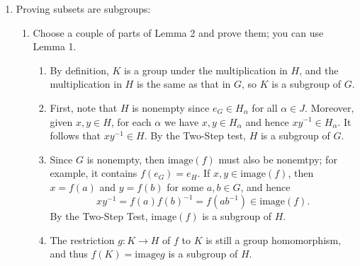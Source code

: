 \documentclass[12pt]{amsart}
\newcommand{\Bold}[1]{\contour{black}{#1}}
\newcommand{\solution}[1]{\ifthenelse {\equal{\displaysol}{1}} {\begin{framed}{\color{meretale}\noindent #1}\end{framed}} { \ }}
\newcommand\itemA{\stepcounter{enumi}\item[{\Bold{(\theenumi)}}]}
\newcommand\itema{\stepcounter{enumii}\item[{\Bold{(\theenumii)}}]}
\begin{document}
\begin{enumerate}
\itemA Proving subsets are subgroups:
\begin{enumerate}
\itema Choose a couple of parts of Lemma 2 and prove them; you can use Lemma 1.
\solution{\begin{enumerate}
	\item By definition, $K$ is a group under the multiplication in $H$, and the multiplication in $H$ is the same as that in $G$, so $K$ is a subgroup of $G$.
	\item First, note that $H$ is nonempty since $e_G \in H_\alpha$ for all $\alpha\in J$. Moreover, given $x,y\in H$, for each $\alpha$ we have $x,y \in H_\alpha$ and hence $xy^{-1} \in H_\alpha$. It follows that $xy^{-1} \in H$. By the Two-Step test, $H$ is a subgroup of $G$. 
	\item Since $G$ is nonempty, then $\mathrm{image}(f)$ must also be nonemtpy; for example, it contains $f(e_G) = e_H$. If $x,y \in \mathrm{image}(f)$, then $x = f(a)$ and $y = f(b)$ for some $a,b \in G$, and hence 
	$$xy^{-1} =f(a)f(b)^{-1} = f(ab^{-1}) \in \mathrm{image}(f).$$
	By the Two-Step Test, $\mathrm{image}(f)$ is a subgroup of $H$. 
	
	\item The restriction $g\!: K \to H$ of $f$ to $K$ is still a group homomorphism, and thus $f(K) = \mathrm{image} g$ is a subgroup of $H$. 
	

\end{enumerate}}
\end{enumerate}
\end{enumerate}
\end{document}

